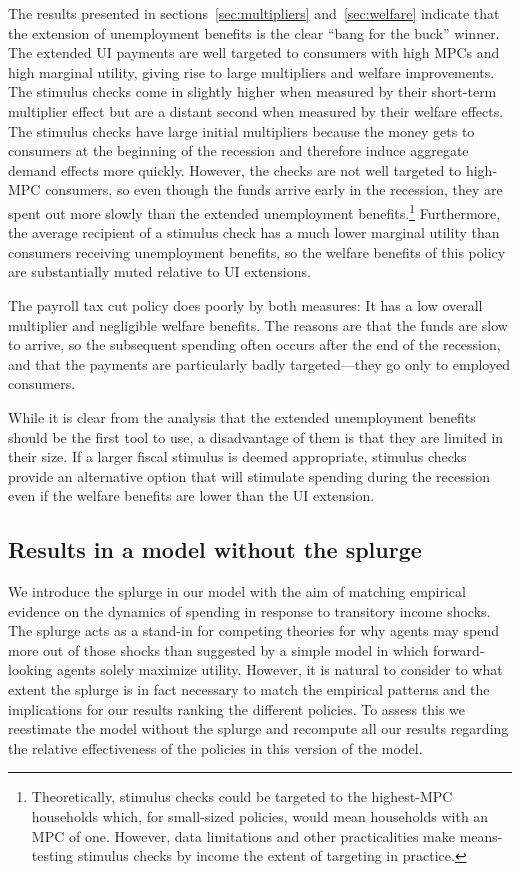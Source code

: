 \documentclass{econsocart}
\begin{document}
The results presented in sections~\ref{sec:multipliers} and~\ref{sec:welfare} indicate that the extension of unemployment benefits is the clear ``bang for the buck'' winner.
The extended UI payments are well targeted to consumers with high MPCs and high marginal utility, giving rise to large multipliers and welfare improvements.
The stimulus checks come in slightly higher when measured by their short-term multiplier effect but are a distant second when measured by their welfare effects.
The stimulus checks have large initial multipliers because the money gets to consumers at the beginning of the recession and therefore induce aggregate demand effects more quickly.
However, the checks are not well targeted to high-MPC consumers, so even though the funds arrive early in the recession, they are spent out more slowly than the extended unemployment benefits.\footnote{Theoretically, stimulus checks could be targeted to the highest-MPC households which, for small-sized policies, would mean households with an MPC of one.
  However, data limitations and other practicalities make means-testing stimulus checks by income the extent of targeting in practice.} Furthermore, the average recipient of a stimulus check has a much lower marginal utility than consumers receiving unemployment benefits, so the welfare benefits of this policy are substantially muted relative to UI extensions.

The payroll tax cut policy does poorly by both measures: It has a low overall multiplier and negligible welfare benefits.
The reasons are that the funds are slow to arrive, so the subsequent spending often occurs after the end of the recession, and that the payments are particularly badly targeted---they go only to employed consumers.

While it is clear from the analysis that the extended unemployment benefits should be the first tool to use, a disadvantage of them is that they are limited in their size.
If a larger fiscal stimulus is deemed appropriate, stimulus checks provide an alternative option that will stimulate spending during the recession even if the welfare benefits are lower than the UI extension.

\FloatBarrier
\subsection{Results in a model without the splurge}

We introduce the splurge in our model with the aim of matching empirical evidence on the dynamics of spending in response to transitory income shocks.
The splurge acts as a stand-in for competing theories for why agents may spend more out of those shocks than suggested by a simple model in which forward-looking agents solely maximize utility.
However, it is natural to consider to what extent the splurge is in fact necessary to match the empirical patterns and the implications for our results ranking the different policies.
To assess this we  reestimate the model without the splurge and recompute all our results regarding the relative effectiveness of the policies in this version of the model.
\end{document}
